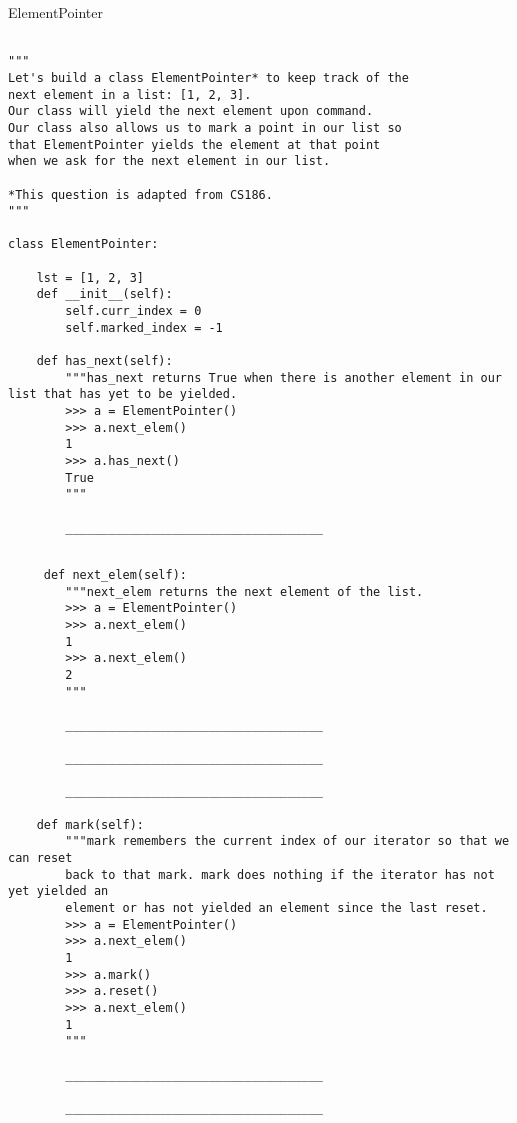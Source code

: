 \documentclass{exam}
\begin{document}
\begin{questions}
\clearpage
\item ElementPointer
 
 \begin{lstlisting}
 
"""
Let's build a class ElementPointer* to keep track of the 
next element in a list: [1, 2, 3].
Our class will yield the next element upon command.
Our class also allows us to mark a point in our list so 
that ElementPointer yields the element at that point 
when we ask for the next element in our list.

*This question is adapted from CS186. 
"""

class ElementPointer:

    lst = [1, 2, 3]
    def __init__(self):
        self.curr_index = 0
        self.marked_index = -1

    def has_next(self):
        """has_next returns True when there is another element in our list that has yet to be yielded.
        >>> a = ElementPointer()
        >>> a.next_elem()
        1
        >>> a.has_next()
        True                                   
        """
        
        ____________________________________
\end{lstlisting}
\newpage
\begin{lstlisting}
        
     def next_elem(self):
        """next_elem returns the next element of the list.
        >>> a = ElementPointer()
        >>> a.next_elem()
        1
        >>> a.next_elem()
        2                                      
        """
        
        ____________________________________
        
        ____________________________________
        
        ____________________________________
            
    def mark(self):
        """mark remembers the current index of our iterator so that we can reset
        back to that mark. mark does nothing if the iterator has not yet yielded an
        element or has not yielded an element since the last reset.
        >>> a = ElementPointer()
        >>> a.next_elem()
        1   
        >>> a.mark()
        >>> a.reset()
        >>> a.next_elem()
        1
        """
        
        ____________________________________
        
        ____________________________________
        

\end{lstlisting}
\end{questions}
\end{document}
